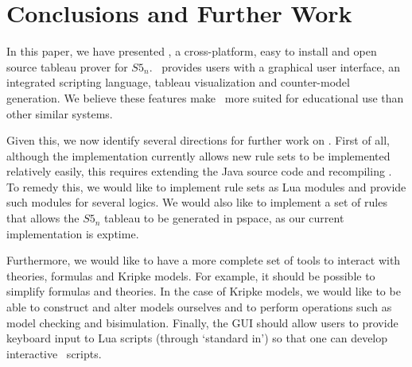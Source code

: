 \section{Conclusions and Further Work}
\label{sec:discussion}

In this paper, we have presented \oops, a cross-platform, easy to install and
open source tableau prover for $S5_n$.
\oops\ provides users with a graphical user interface, an integrated scripting
language, tableau visualization and counter-model generation. 
We believe these features make \oops\ more suited for educational use than
other similar systems.

Given this, we now identify several directions for further work on \oops.
First of all, although the implementation currently allows new rule sets to be
implemented relatively easily, this requires extending the Java source code and
recompiling \oops. To remedy this, we would like to implement rule sets as Lua
modules and provide such modules for several logics. We would also like to
implement a set of rules that allows the $S5_n$ tableau to be generated in
{\sc pspace}, as our current implementation is {\sc exptime}.

Furthermore, we would like to have a more complete set of tools to interact
with theories, formulas and Kripke models. For example, it should be possible
to simplify formulas and theories. In the case of Kripke models, we would like
to be able to construct and alter models ourselves and to perform operations
such as model checking and bisimulation. Finally, the GUI should allow users
to provide keyboard input to Lua scripts (through `standard in') so that one
can develop interactive \oops\ scripts.
